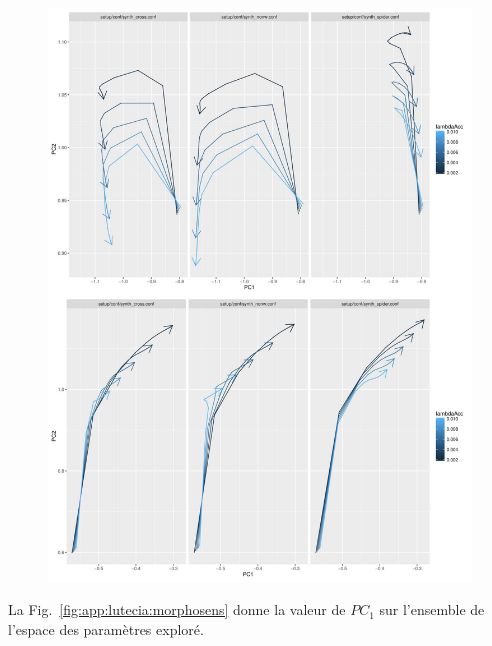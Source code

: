 \begin{figure}
	\includegraphics[width=\linewidth]{Figures/Final/A-lutecia-morphotrajs.jpg}
\end{figure}


La Fig.~\ref{fig:app:lutecia:morphosens} donne la valeur de $PC_1$ sur l'ensemble de l'espace des paramètres exploré.


